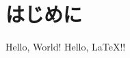 \documentclass[lualatex,ja=standard]{bxjsarticle}
\begin{document}
\section{はじめに}
Hello, World! Hello, LaTeX!!
\end{document}
